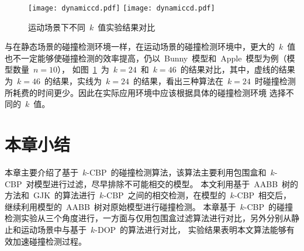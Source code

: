 \begin{figure}[H] 
\centering
{}
{  
   \texttt{[image: dynamiccd.pdf]}
}
{  
    \texttt{[image: dynamiccd.pdf]}
}
\caption{运动场景下不同~$k$~值实验结果对比}
\label{fig:chart:exp:kdop:kcbp:k24:k46:dynamic}
\end{figure}

与在静态场景的碰撞检测环境一样，在运动场景的碰撞检测环境中，更大的~$k$~值也不一定能够使碰撞检测的效率提高，仍以~Bunny~模型和~Apple~模型为例（模型数量~$n=10$），
如图~\ref{fig:chart:exp:kdop:kcbp:k24:k46:dynamic}~为~$k=24$~和~$k=46$~的结果对比，其中，虚线的结果为~$k=46$~的结果，实线为~$k=24$~的结果，看出三种算法在~$k=24$~时碰撞检测所耗费的时间更少。因此在实际应用环境中应该根据具体的碰撞检测环境
选择不同的~$k$~值。

\section{本章小结}
\label{sec:chap03:summary}

本章主要介绍了基于~$k$-CBP~的碰撞检测算法，该算法主要利用包围盒和~$k$-CBP~对模型进行过滤，尽早排除不可能相交的模型。
本文利用基于~AABB~树的方法和~GJK~的算法进行~$k$-CBP~之间的相交检测，在模型的~$k$-CBP~相交后，继续利用模型的~AABB~树对原始模型进行碰撞检测。
本章基于~$k$-CBP~的碰撞检测实验从三个角度进行，一方面与仅用包围盒过滤算法进行对比，另外分别从静止和运动场景中与基于~$k$-DOP~的算法进行对比，
实验结果表明本文算法能够有效加速碰撞检测过程。

